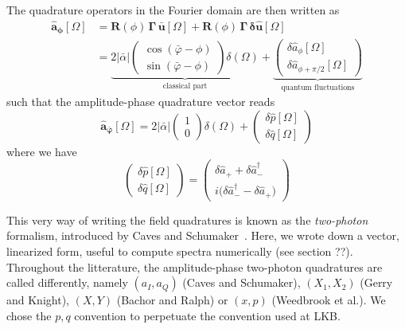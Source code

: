 The quadrature operators in the Fourier domain are then written as 
\begin{equation}
  \begin{split}
      \mathbf{\hat{a}_\phi}[\Omega] & = \mathbf{R}(\phi) \, \mathbf{\Gamma} \,\mathbf{\bar{u}}[\Omega] + \mathbf{R}(\phi) \, \mathbf{\Gamma} \, \mathbf{\delta \hat{u}}[\Omega] \\
      & = \underbrace{2|\bar{\alpha}| \begin{pmatrix}
  \cos(\bar{\varphi}-\phi) \\[2pt]
  \sin(\bar{\varphi}-\phi)
\end{pmatrix} \delta(\Omega)}_{\text{classical part}} +
\underbrace{\begin{pmatrix}
  \delta \hat{a}_\phi[\Omega] \\[2pt]
\delta \hat{a}_{\phi+\pi/2}[\Omega] \end{pmatrix}}_{\text{quantum fluctuations}}
  \end{split}
\end{equation}
such that the amplitude-phase quadrature vector reads
\begin{equation}
      \mathbf{\hat{a}_{\bar{\varphi}}}[\Omega]  = 2|\bar{\alpha}| \begin{pmatrix}
  1 \\[2pt]
  0
\end{pmatrix} \delta(\Omega) +
\begin{pmatrix}
  \delta \hat{p}[\Omega] \\[2pt]
\delta \hat{q}[\Omega]
\end{pmatrix}
\end{equation}
where we have 
\begin{equation}
  \begin{pmatrix}
  \delta \hat{p}[\Omega] \\[2pt]
\delta \hat{q}[\Omega]
\end{pmatrix} = \begin{pmatrix}
  \delta \hat{a}_+ + \delta \hat{a}^\dagger_-\\[2pt]
i\big(\delta \hat{a}^\dagger_- - \delta \hat{a}_+\big)  
\end{pmatrix}
\label{eq:2photons}
\end{equation}

This very way of writing the field quadratures is known as the \textit{two-photon} formalism, introduced by Caves and Schumaker~\cite{Caves1985,Caves1985a}. Here, we wrote down a vector, linearized form, useful to compute spectra numerically (see section ??). Throughout the litterature, the amplitude-phase two-photon quadratures are called differently, namely $(a_I, a_Q)$ (Caves and Schumaker), $(X_1, X_2)$ (Gerry and Knight), $(X, Y)$ (Bachor and Ralph) or $(x, p)$ (Weedbrook et al.). We chose the $p, q$ convention to perpetuate the convention used at LKB. \\

